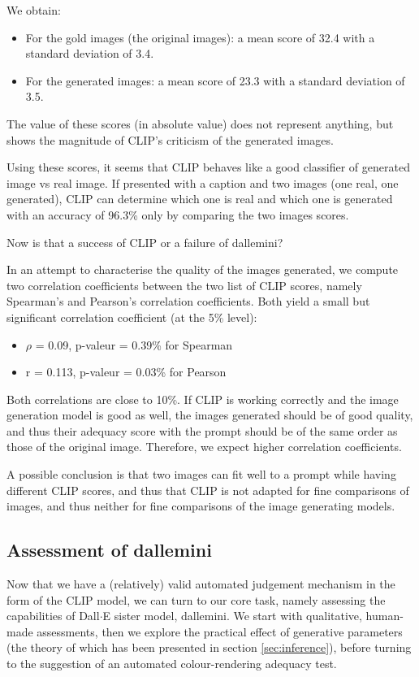 \documentclass{article}
\begin{document}
\begin{multicols}{2}
We obtain:
\begin{itemize}
    \item For the gold images (the original images): a mean score of 32.4 with a standard deviation of 3.4.
    \item For the generated images: a mean score of 23.3 with a standard deviation of 3.5.
\end{itemize}

The value of these scores (in absolute value) does not represent anything, but shows the magnitude of CLIP's criticism of the generated images.

Using these scores, it seems that CLIP behaves like a good classifier of generated image vs real image. If presented with a caption and two images (one real, one generated), CLIP can determine which one is real and which one is generated with an accuracy of 96.3\% only by comparing the two images scores.

Now is that a success of CLIP or a failure of \gls{dallemini}?

In an attempt to characterise the quality of the images generated, we compute two correlation coefficients between the two list of CLIP scores, namely Spearman's and Pearson's correlation coefficients. Both yield a small but significant correlation coefficient (at the 5\% level):
\begin{itemize}
    \item $\rho$ = 0.09, p-valeur = 0.39\% for Spearman
    \item r = 0.113, p-valeur = 0.03\% for Pearson
\end{itemize}
Both correlations are close to 10\%. If CLIP is working correctly and the image generation model is good as well, the images generated should be of good quality, and thus their adequacy score with the prompt should be of the same order as those of the original image. Therefore, we expect higher correlation coefficients. 

A possible conclusion is that two images can fit well to a prompt while having different CLIP scores, and thus that CLIP is not adapted for fine comparisons of images, and thus neither for fine comparisons of the image generating models. 

\subsection{Assessment of \gls{dallemini}}

Now that we have a (relatively) valid automated judgement mechanism in the form of the CLIP model, we can turn to our core task, namely assessing the capabilities of Dall$\cdot$E sister model, \gls{dallemini}. We start with qualitative, human-made assessments, then we explore the practical effect of generative parameters (the theory of which has been presented in section \ref{sec:inference}), before turning to the suggestion of an automated colour-rendering adequacy test.


\end{multicols}
\end{document}
